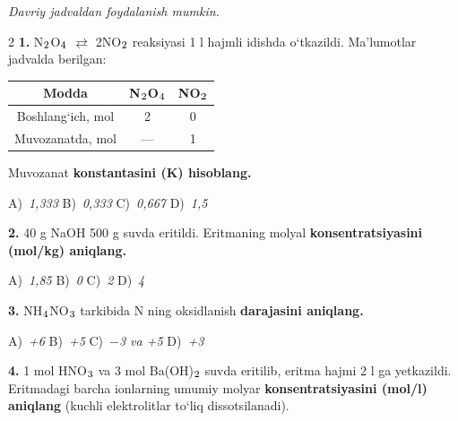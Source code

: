 \documentclass[11pt,a4paper]{article}
\renewcommand{\normalsize}{\fontsize{10.9}{13.4}\selectfont}
\renewcommand{\textsubscript}[1]{\ensuremath{_{\text{\fontsize{8}{8}\selectfont #1}}}}
\begin{document}
\normalsize
\thispagestyle{first}
\noindent{}
\par\medskip
\noindent\textit{Davriy jadvaldan foydalanish mumkin.}
\par\medskip
\begin{multicols}{2}
\noindent\textbf{1.} N\textsubscript{2}O\textsubscript{4} $\rightleftarrows$ 2NO\textsubscript{2} reaksiyasi 1 l hajmli idishda o`tkazildi. Ma'lumotlar jadvalda berilgan:
\begin{center}
\renewcommand{\arraystretch}{1.15}
\begin{tabular}{|c|c|c|}\hline
\textbf{Modda} & \textbf{N\textsubscript{2}O\textsubscript{4}} & \textbf{NO\textsubscript{2}} \\ \hline
Boshlang`ich, mol & 2 & 0 \\ \hline
Muvozanatda, mol & --- & 1 \\ \hline
\end{tabular}
\end{center}
Muvozanat \textbf{konstantasini (K) hisoblang.}

\noindent A)~\textsl{1,333} \hfill B)~\textsl{0,333} \hfill C)~\textsl{0,667} \hfill D)~\textsl{1,5}\par
\vspace{4pt}
\noindent\textbf{2.} 40 g NaOH 500 g suvda eritildi. Eritmaning molyal \textbf{konsentratsiyasini (mol/kg) aniqlang.}

\noindent A)~\textsl{1,85} \hfill B)~\textsl{0} \hfill C)~\textsl{2} \hfill D)~\textsl{4}\par
\vspace{4pt}
\noindent\textbf{3.} NH\textsubscript{4}NO\textsubscript{3} tarkibida N ning oksidlanish \textbf{darajasini aniqlang.}

\noindent A)~\textsl{+6} \hfill B)~\textsl{+5} \hfill C)~\textsl{$-$3 va +5} \hfill D)~\textsl{+3}\par
\vspace{4pt}
\noindent\textbf{4.} 1 mol HNO\textsubscript{3} va 3 mol Ba(OH)\textsubscript{2} suvda eritilib, eritma hajmi 2 l ga yetkazildi. Eritmadagi barcha ionlarning umumiy molyar \textbf{konsentratsiyasini (mol/l) aniqlang} (kuchli elektrolitlar to`liq dissotsilanadi).


\end{multicols}
\end{document}
